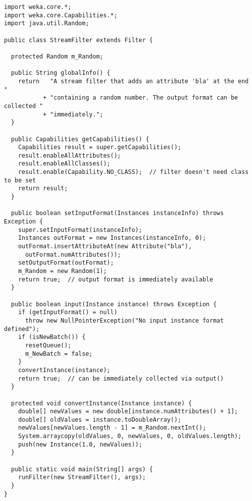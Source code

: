 
\begin{verbatim}
import weka.core.*;
import weka.core.Capabilities.*;
import java.util.Random;

public class StreamFilter extends Filter {

  protected Random m_Random;

  public String globalInfo() {
    return   "A stream filter that adds an attribute 'bla' at the end "
           + "containing a random number. The output format can be collected "
           + "immediately.";
  }

  public Capabilities getCapabilities() {
    Capabilities result = super.getCapabilities();
    result.enableAllAttributes();
    result.enableAllClasses();
    result.enable(Capability.NO_CLASS);  // filter doesn't need class to be set
    return result;
  }

  public boolean setInputFormat(Instances instanceInfo) throws Exception {
    super.setInputFormat(instanceInfo);
    Instances outFormat = new Instances(instanceInfo, 0);
    outFormat.insertAttributeAt(new Attribute("bla"),
	  outFormat.numAttributes());
    setOutputFormat(outFormat);
    m_Random = new Random(1);
    return true;  // output format is immediately available
  }

  public boolean input(Instance instance) throws Exception {
    if (getInputFormat() = null)
      throw new NullPointerException("No input instance format defined");
    if (isNewBatch()) {
      resetQueue();
      m_NewBatch = false;
    }
    convertInstance(instance);
    return true;  // can be immediately collected via output()
  }

  protected void convertInstance(Instance instance) {
    double[] newValues = new double[instance.numAttributes() + 1];
    double[] oldValues = instance.toDoubleArray();
    newValues[newValues.length - 1] = m_Random.nextInt();
    System.arraycopy(oldValues, 0, newValues, 0, oldValues.length);
    push(new Instance(1.0, newValues));
  }

  public static void main(String[] args) {
    runFilter(new StreamFilter(), args);
  }
}
\end{verbatim}
